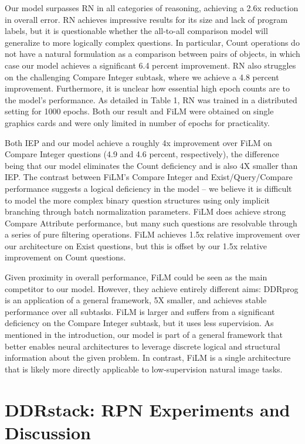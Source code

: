 \documentclass{article}
\begin{document}
Our model surpasses RN in all categories of reasoning, achieving a 2.6x reduction in overall error. RN achieves impressive results for its size and lack of program labels, but it is questionable whether the all-to-all comparison model will generalize to more logically complex questions. In particular, Count operations do not have a natural formulation as a comparison between pairs of objects, in which case our model achieves a significant 6.4 percent improvement. RN also struggles on the challenging Compare Integer subtask, where we achieve a 4.8 percent improvement. Furthermore, it is unclear how essential high epoch counts are to the model's performance. As detailed in Table 1, RN was trained in a distributed setting for 1000 epochs. Both our result and FiLM were obtained on single graphics cards and were only limited in number of epochs for practicality.

Both IEP and our model achieve a roughly 4x improvement over FiLM on Compare Integer questions (4.9 and 4.6 percent, respectively), the difference being that our model eliminates the Count deficiency and is also 4X smaller than IEP. The contrast between FiLM's Compare Integer and Exist/Query/Compare performance suggests a logical deficiency in the model -- we believe it is difficult to model the more complex binary question structures using only implicit branching through batch normalization parameters. FiLM does achieve strong Compare Attribute performance, but many such questions are resolvable through a series of pure filtering operations. FiLM achieves 1.5x relative improvement over our architecture on Exist questions, but this is offset by our 1.5x relative improvement on Count questions. 

Given proximity in overall performance, FiLM could be seen as the main competitor to our model. However, they achieve entirely different aims: DDRprog is an application of a general framework, 5X smaller, and achieves stable performance over all subtasks. FiLM is larger and suffers from a significant deficiency on the Compare Integer subtask, but it uses less supervision. As mentioned in the introduction, our model is part of a general framework that better enables neural architectures to leverage discrete logical and structural information about the given problem. In contrast, FiLM is a single architecture that is likely more directly applicable to low-supervision natural image tasks.

\section{DDRstack: RPN Experiments and Discussion}
\end{document}

